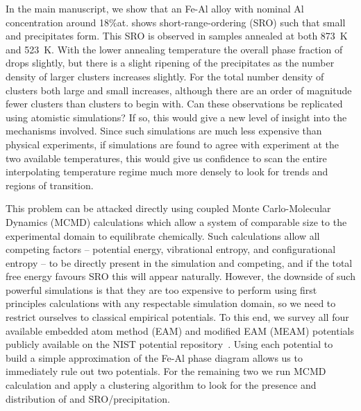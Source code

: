 In the main manuscript, we show that an Fe-Al alloy with nominal Al concentration around 18\%at. shows short-range-ordering (SRO) such that small \DOTHREE and \BTWO precipitates form.
This SRO is observed in samples annealed at both 873~K and 523~K.
With the lower annealing temperature the overall phase fraction of \DOTHREE drops slightly, but there is a slight ripening of the precipitates as the number density of larger clusters increases slightly.
For \BTWO the total number density of clusters both large and small increases, although there are an order of magnitude fewer \BTWO clusters than \DOTHREE clusters to begin with.
Can these observations be replicated using atomistic simulations?
If so, this would give a new level of insight into the mechanisms involved.
Since such simulations are much less expensive than physical experiments, if simulations are found to agree with experiment at the two available temperatures, this would give us confidence to scan the entire interpolating temperature regime much more densely to look for trends and regions of transition.

This problem can be attacked directly using coupled Monte Carlo-Molecular Dynamics (MCMD) calculations which allow a system of comparable size to the experimental domain to equilibrate chemically.
Such calculations allow all competing factors -- potential energy, vibrational entropy, and configurational entropy -- to be directly present in the simulation and competing, and if the total free energy favours SRO this will appear naturally.
However, the downside of such powerful simulations is that they are too expensive to perform using first principles calculations with any respectable simulation domain, so we need to restrict ourselves to classical empirical potentials.
To this end, we survey all four available embedded atom method (EAM) and modified EAM (MEAM) potentials publicly available on the NIST potential repository~\cite{nist}.
Using each potential to build a simple approximation of the Fe-Al phase diagram allows us to immediately rule out two potentials.
For the remaining two we run MCMD calculation and apply a clustering algorithm to look for the presence and distribution of \DOTHREE and \BTWO SRO/precipitation.
